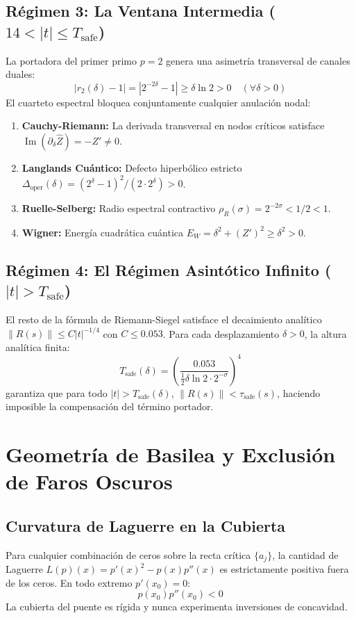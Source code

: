 \documentclass[11pt,a4paper]{article}
\theoremstyle{plain}
\theoremstyle{definition}
\begin{document}
\subsection{Régimen 3: La Ventana Intermedia ($14 < |t| \le T_{\text{safe}}$)}
La portadora del primer primo $p = 2$ genera una asimetría transversal de canales duales:
$$|r_2(\delta) - 1| = |2^{-2\delta} - 1| \ge \delta \ln 2 > 0 \quad (\forall \delta > 0)$$
El cuarteto espectral bloquea conjuntamente cualquier anulación nodal:
\begin{enumerate}
    \item \textbf{Cauchy-Riemann:} La derivada transversal en nodos críticos satisface $\operatorname{Im}(\partial_\delta \hat{Z}) = -Z' \ne 0$.
    \item \textbf{Langlands Cuántico:} Defecto hiperbólico estricto $\Delta_{\text{oper}}(\delta) = (2^\delta - 1)^2 / (2 \cdot 2^\delta) > 0$.
    \item \textbf{Ruelle-Selberg:} Radio espectral contractivo $\rho_R(\sigma) = 2^{-2\sigma} < 1/2 < 1$.
    \item \textbf{Wigner:} Energía cuadrática cuántica $E_W = \delta^2 + (Z')^2 \ge \delta^2 > 0$.
\end{enumerate}

\subsection{Régimen 4: El Régimen Asintótico Infinito ($|t| > T_{\text{safe}}$)}
El resto de la fórmula de Riemann-Siegel satisface el decaimiento analítico $\|R(s)\| \le C |t|^{-1/4}$ con $C \le 0.053$. Para cada desplazamiento $\delta > 0$, la altura analítica finita:
$$T_{\text{safe}}(\delta) = \left( \frac{0.053}{\frac{1}{2}\delta \ln 2 \cdot 2^{-\sigma}} \right)^4$$
garantiza que para todo $|t| > T_{\text{safe}}(\delta)$, $\|R(s)\| < \tau_{\text{safe}}(s)$, haciendo imposible la compensación del término portador.

\section{Geometría de Basilea y Exclusión de Faros Oscuros}

\subsection{Curvatura de Laguerre en la Cubierta}
Para cualquier combinación de ceros sobre la recta crítica $\{a_j\}$, la cantidad de Laguerre $L(p)(x) = p'(x)^2 - p(x)p''(x)$ es estrictamente positiva fuera de los ceros. En todo extremo $p'(x_0) = 0$:
$$p(x_0) p''(x_0) < 0$$
La cubierta del puente es rígida y nunca experimenta inversiones de concavidad.
\end{document}
